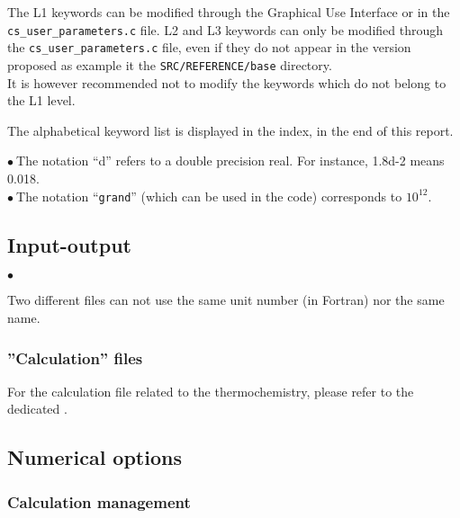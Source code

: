 The L1 keywords can be modified through the Graphical Use Interface or
in the \texttt{cs\_user\_parameters.c} file. L2 and L3 keywords can only be modified through
the \texttt{cs\_user\_parameters.c} file, even if they do not appear in the version proposed
as example it the \texttt{SRC/REFERENCE/base} directory.\\
It is however recommended not to modify the keywords which do not belong to the L1
level.

The alphabetical keyword list is displayed in the index, in the end of
this report.

$\bullet\ $The notation ``d'' refers to a double precision real. For
           instance, 1.8d-2 means 0.018. \\
$\bullet\ $The notation ``{\tt grand}'' (which can be used in the code)
corresponds to $10^{12}$.

\subsection{Input-output}

\begin{list}{$\bullet$}{}
\item Two different files can not use the same unit number (in Fortran) nor the
      same name.
\end{list}

\subsubsection{''Calculation'' files}



For the calculation file related to the thermochemistry, please refer
to the dedicated .

\subsection{Numerical options}
\subsubsection{Calculation management}

